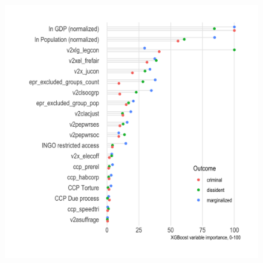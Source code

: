 \documentclass[12pt]{article}
\begin{document}
\begin{figure}
\includegraphics[width=.9\textwidth]{../output/figures/xgboost-variable-importance.png}
\end{figure}


\end{document}
